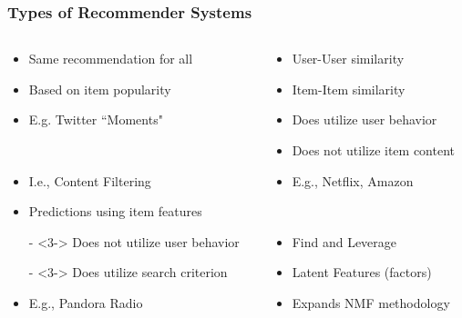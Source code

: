 \documentclass[xcolor={dvipsnames}]{beamer}
\begin{document}
\frame
{
\frametitle{Types of Recommender Systems}

\begin{columns}
\begin{column}{.5\textwidth}
\small


\begin{itemize}
\item<2-> Same recommendation for all
\item<2-> Based on item popularity
\item<2-> E.g. Twitter ``Moments"
\end{itemize}
${}$\\
\begin{itemize}
\item<3-> I.e., Content Filtering
\item<3-> Predictions using item features 
\item[-]<3-> Does not utilize user behavior 
\item[-]<3-> Does utilize search criterion
\item<3-> E.g., Pandora Radio
\end{itemize}

\end{column}
\begin{column}{.5\textwidth}

\small

\color{Maroon}

\begin{itemize}
\color{Maroon}
\item<4-> User-User similarity
\item<4-> Item-Item similarity
\item<4->[-] Does utilize user behavior 
\item<4->[-] Does not utilize item content
\item<4-> E.g., Netflix, Amazon
\end{itemize}
${}$\\

\color{NavyBlue}
\begin{itemize}
\color{NavyBlue}
\item<5-> Find and Leverage 
\item<5->[] Latent Features (factors)
\item<5-> Expands NMF methodology
\end{itemize}

\end{column}
\end{columns}
${}$\\


}
\end{document}
